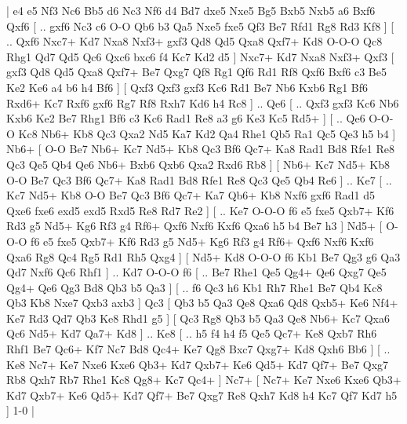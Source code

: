 \makegametitle 
|   e4   e5    Nf3   Nc6    Bb5   d6    Nc3   Nf6    d4   Bd7    dxe5   Nxe5    Bg5   Bxb5    Nxb5   a6    Bxf6   Qxf6 [ .. gxf6  Nc3 c6  O-O Qb6  b3 Qa5  Nxe5 fxe5  Qf3 Be7  Rfd1 Rg8  Rd3 Kf8   ]  [ .. Qxf6  Nxc7+ Kd7  Nxa8 Nxf3+  gxf3 Qd8  Qd5 Qxa8  Qxf7+ Kd8  O-O-O Qc8  Rhg1 Qd7  Qd5 Qc6  Qxc6 bxc6  f4 Kc7  Kd2 d5   ]  Nxc7+   Kd7    Nxa8   Nxf3+    Qxf3 [  gxf3 Qd8  Qd5 Qxa8  Qxf7+ Be7  Qxg7 Qf8  Rg1 Qf6  Rd1 Rf8  Qxf6 Bxf6  c3 Be5  Ke2 Ke6  a4 b6  h4 Bf6   ]  [  Qxf3 Qxf3  gxf3 Kc6  Rd1 Be7  Nb6 Kxb6  Rg1 Bf6  Rxd6+ Kc7  Rxf6 gxf6  Rg7 Rf8  Rxh7 Kd6  h4 Rc8   ] .. Qe6 [ .. Qxf3  gxf3 Kc6  Nb6 Kxb6  Ke2 Be7  Rhg1 Bf6  c3 Kc6  Rad1 Re8  a3 g6  Ke3 Kc5  Rd5+   ]  [ .. Qe6  O-O-O Kc8  Nb6+ Kb8  Qc3 Qxa2  Nd5 Ka7  Kd2 Qa4  Rhe1 Qb5  Ra1 Qc5  Qe3 h5  b4   ]  Nb6+ [  O-O Be7  Nb6+ Kc7  Nd5+ Kb8  Qc3 Bf6  Qc7+ Ka8  Rad1 Bd8  Rfe1 Re8  Qc3 Qe5  Qb4 Qe6  Nb6+ Bxb6  Qxb6 Qxa2  Rxd6 Rb8   ]  [  Nb6+ Kc7  Nd5+ Kb8  O-O Be7  Qc3 Bf6  Qc7+ Ka8  Rad1 Bd8  Rfe1 Re8  Qc3 Qe5  Qb4 Re6   ] .. Ke7 [ .. Kc7  Nd5+ Kb8  O-O Be7  Qc3 Bf6  Qc7+ Ka7  Qb6+ Kb8  Nxf6 gxf6  Rad1 d5  Qxe6 fxe6  exd5 exd5  Rxd5 Re8  Rd7 Re2   ]  [ .. Ke7  O-O-O f6  e5 fxe5  Qxb7+ Kf6  Rd3 g5  Nd5+ Kg6  Rf3 g4  Rf6+ Qxf6  Nxf6 Kxf6  Qxa6 h5  b4 Be7  h3   ]  Nd5+ [  O-O-O f6  e5 fxe5  Qxb7+ Kf6  Rd3 g5  Nd5+ Kg6  Rf3 g4  Rf6+ Qxf6  Nxf6 Kxf6  Qxa6 Rg8  Qc4 Rg5  Rd1 Rh5  Qxg4   ]  [  Nd5+ Kd8  O-O-O f6  Kb1 Be7  Qg3 g6  Qa3 Qd7  Nxf6 Qc6  Rhf1   ] .. Kd7    O-O-O   f6 [ .. Be7  Rhe1 Qe5  Qg4+ Qe6  Qxg7 Qe5  Qg4+ Qe6  Qg3 Bd8  Qb3 b5  Qa3   ]  [ .. f6  Qc3 h6  Kb1 Rh7  Rhe1 Be7  Qb4 Kc8  Qb3 Kb8  Nxe7 Qxb3  axb3   ]  Qc3 [  Qb3 b5  Qa3 Qe8  Qxa6 Qd8  Qxb5+ Ke6  Nf4+ Ke7  Rd3 Qd7  Qb3 Ke8  Rhd1 g5   ]  [  Qc3 Rg8  Qb3 b5  Qa3 Qe8  Nb6+ Kc7  Qxa6 Qc6  Nd5+ Kd7  Qa7+ Kd8   ] .. Ke8 [ .. h5  f4 h4  f5 Qe5  Qc7+ Ke8  Qxb7 Rh6  Rhf1 Be7  Qc6+ Kf7  Nc7 Bd8  Qc4+ Ke7  Qg8 Bxc7  Qxg7+ Kd8  Qxh6 Bb6   ]  [ .. Ke8  Nc7+ Ke7  Nxe6 Kxe6  Qb3+ Kd7  Qxb7+ Ke6  Qd5+ Kd7  Qf7+ Be7  Qxg7 Rb8  Qxh7 Rb7  Rhe1 Kc8  Qg8+ Kc7  Qc4+   ]  Nc7+    [  Nc7+ Ke7  Nxe6 Kxe6  Qb3+ Kd7  Qxb7+ Ke6  Qd5+ Kd7  Qf7+ Be7  Qxg7 Re8  Qxh7 Kd8  h4 Kc7  Qf7 Kd7  h5   ] 1-0  |
